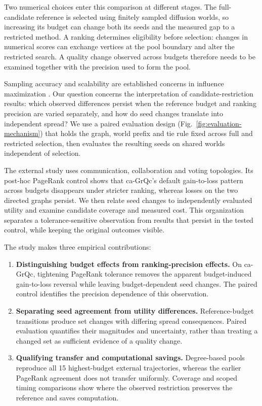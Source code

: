 \documentclass[smallextended]{svjour3}
\begin{document}
Two numerical choices enter this comparison at different stages. The full-candidate reference is selected using finitely sampled diffusion worlds, so increasing its budget can change both its seeds and the measured gap to a restricted method. A ranking determines eligibility before selection: changes in numerical scores can exchange vertices at the pool boundary and alter the restricted search. A quality change observed across budgets therefore needs to be examined together with the precision used to form the pool.

Sampling accuracy and scalability are established concerns in influence maximization \cite{ref1,ref2,ref8,ref9,ref16}. Our question concerns the interpretation of candidate-restriction results: which observed differences persist when the reference budget and ranking precision are varied separately, and how do seed changes translate into independent spread? We use a paired evaluation design (Fig.~\ref{fig:evaluation-mechanism}) that holds the graph, world prefix and tie rule fixed across full and restricted selection, then evaluates the resulting seeds on shared worlds independent of selection.

The external study uses communication, collaboration and voting topologies. Its post-hoc PageRank control shows that ca-GrQc's default gain-to-loss pattern across budgets disappears under stricter ranking, whereas losses on the two directed graphs persist. We then relate seed changes to independently evaluated utility and examine candidate coverage and measured cost. This organization separates a tolerance-sensitive observation from results that persist in the tested control, while keeping the original outcomes visible.

The study makes three empirical contributions:
\begin{enumerate}
\item[(1)] \textbf{Distinguishing budget effects from ranking-precision effects.} On ca-GrQc, tightening PageRank tolerance removes the apparent budget-induced gain-to-loss reversal while leaving budget-dependent seed changes. The paired control identifies the precision dependence of this observation.
\item[(2)] \textbf{Separating seed agreement from utility differences.} Reference-budget transitions produce set changes with differing spread consequences. Paired evaluation quantifies their magnitudes and uncertainty, rather than treating a changed set as sufficient evidence of a quality change.
\item[(3)] \textbf{Qualifying transfer and computational savings.} Degree-based pools reproduce all 15 highest-budget external trajectories, whereas the earlier PageRank agreement does not transfer uniformly. Coverage and scoped timing comparisons show where the observed restriction preserves the reference and saves computation.
\end{enumerate}
\end{document}
